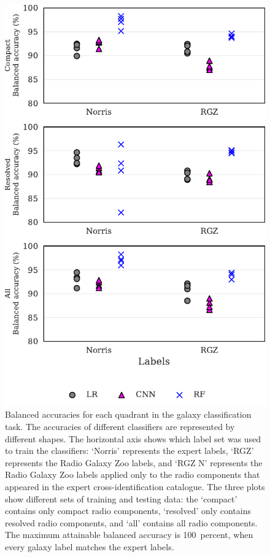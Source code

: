 \documentclass[fleqn,usenatbib,usedcolumn]{mnras}
\begin{document}
    \begin{figure}
    \centering
    \includegraphics[width=\columnwidth]{images/cdfs_ba_grid.pdf}
    \caption{Balanced accuracies for each quadrant in the galaxy
      classification task. The accuracies of different classifiers are represented
      by different shapes. The horizontal axis shows which label set was used to
      train the classifiers: `Norris' represents the expert labels, `RGZ'
      represents the Radio Galaxy Zoo labels, and `RGZ N' represents the Radio
      Galaxy Zoo labels applied only to the radio components that appeared in the
      expert cross-identification catalogue. The three plots show different sets
      of training and testing data: the `compact' contains only compact radio
      components, `resolved' only contains resolved radio components, and `all'
      contains all radio components. The maximum attainable balanced accuracy is
      100~percent, when every galaxy label matches the expert labels.
      \label{fig:ba}}
    \end{figure}
\end{document}
